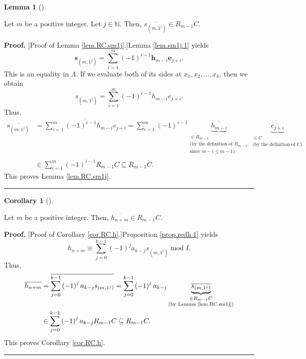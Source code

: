 \documentclass[numbers=enddot,12pt,final,onecolumn,notitlepage]{scrartcl}%
\theoremstyle{definition}
\newtheorem{lem}[theo]{Lemma}
\newenvironment{lemma}[1][]
{\begin{lem}[#1]\begin{leftbar}}
{\end{leftbar}\end{lem}}
\newtheorem{coro}[theo]{Corollary}
\newenvironment{corollary}[1][]
{\begin{coro}[#1]\begin{leftbar}}
{\end{leftbar}\end{coro}}
\newenvironment{proof}[1][Proof]{\noindent\textbf{#1.} }{\ \rule{0.5em}{0.5em}}
\let\sumnonlimits\sum
\renewcommand{\sum}{\sumnonlimits\limits}
\begin{document}
\begin{lemma}
\label{lem.RC.sm1j}Let $m$ be a positive integer. Let $j\in\mathbb{N}$. Then,
$\overline{s_{\left(  m,1^{j}\right)  }}\in R_{m-1}C$.
\end{lemma}

\begin{proof}
[Proof of Lemma \ref{lem.RC.sm1j}.]Lemma \ref{lem.sm1j.1} yields%
\[
\mathbf{s}_{\left(  m,1^{j}\right)  }=\sum_{i=1}^{m}\left(  -1\right)
^{i-1}\mathbf{h}_{m-i}\mathbf{e}_{j+i}.
\]
This is an equality in $\Lambda$. If we evaluate both of its sides at
$x_{1},x_{2},\ldots,x_{k}$, then we obtain%
\[
s_{\left(  m,1^{j}\right)  }=\sum_{i=1}^{m}\left(  -1\right)  ^{i-1}%
h_{m-i}e_{j+i}.
\]
Thus,%
\begin{align*}
\overline{s_{\left(  m,1^{j}\right)  }}  &  =\overline{\sum_{i=1}^{m}\left(
-1\right)  ^{i-1}h_{m-i}e_{j+i}}=\sum_{i=1}^{m}\left(  -1\right)
^{i-1}\underbrace{\overline{h_{m-i}}}_{\substack{\in R_{m-1}\\\text{(by the
definition of }R_{m-1}\text{,}\\\text{since }m-i\leq m-1\text{)}%
}}\underbrace{\overline{e_{j+i}}}_{\substack{\in C\\\text{(by the definition
of }C\text{)}}}\\
&  \in\sum_{i=1}^{m}\left(  -1\right)  ^{i-1}R_{m-1}C\subseteq R_{m-1}C.
\end{align*}
This proves Lemma \ref{lem.RC.sm1j}.
\end{proof}

\begin{corollary}
\label{cor.RC.h}Let $m$ be a positive integer. Then, $\overline{h_{n+m}}\in
R_{m-1}C$.
\end{corollary}

\begin{proof}
[Proof of Corollary \ref{cor.RC.h}.]Proposition \ref{prop.redh.1} yields%
\[
h_{n+m}\equiv\sum_{j=0}^{k-1}\left(  -1\right)  ^{j}a_{k-j}s_{\left(
m,1^{j}\right)  }\operatorname{mod}I.
\]
Thus,%
\begin{align*}
\overline{h_{n+m}}  &  =\overline{\sum_{j=0}^{k-1}\left(  -1\right)
^{j}a_{k-j}s_{\left(  m,1^{j}\right)  }}=\sum_{j=0}^{k-1}\left(  -1\right)
^{j}a_{k-j}\underbrace{\overline{s_{\left(  m,1^{j}\right)  }}}_{\substack{\in
R_{m-1}C\\\text{(by Lemma \ref{lem.RC.sm1j})}}}\\
&  \in\sum_{j=0}^{k-1}\left(  -1\right)  ^{j}a_{k-j}R_{m-1}C\subseteq
R_{m-1}C.
\end{align*}
This proves Corollary \ref{cor.RC.h}.
\end{proof}
\end{document}
